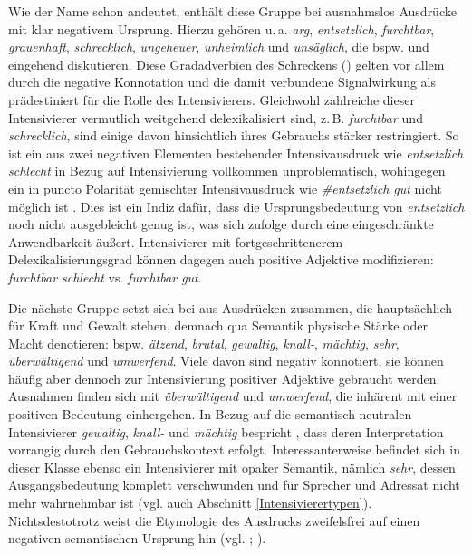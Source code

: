 Wie der Name schon andeutet, enthält diese Gruppe bei \citet[356]{Claudi.2006} ausnahmslos Ausdrücke mit klar negativem Ursprung. Hierzu gehören u.\,a. \textit{arg}, \textit{entsetzlich}, \textit{furchtbar}, \textit{grauenhaft}, \textit{schrecklich}, \textit{ungeheuer}, \textit{unheimlich} und \textit{unsäglich}, die bspw. \citet[165ff.]{Biedermann.1969} und \citet[]{Hentschel.1998b} eingehend diskutieren. Diese \glqq{}Gradadverbien des Schreckens\grqq{} (\citealt[53]{Laitenberger.2016}) gelten vor allem durch die negative Konnotation und die damit verbundene Signalwirkung als prädestiniert für die Rolle des Intensivierers. Gleichwohl zahlreiche dieser Intensivierer vermutlich weitgehend delexikalisiert sind, z.\,B. \textit{furchtbar} und \textit{schrecklich}, sind einige davon hinsichtlich ihres Gebrauchs stärker restringiert. So ist ein aus zwei negativen Elementen bestehender Intensivausdruck wie \textit{entsetzlich schlecht} in Bezug auf Intensivierung vollkommen unproblematisch, wohingegen ein in puncto Polarität gemischter Intensivausdruck wie \textit{\#entsetzlich gut} nicht möglich ist \citep[vgl.][356]{Claudi.2006}. Dies ist ein Indiz dafür, dass die Ursprungsbedeutung von \textit{entsetzlich} noch nicht ausgebleicht genug ist, was sich \citet[284]{Tagliamonte.2005} zufolge durch eine eingeschränkte Anwendbarkeit äußert. Intensivierer mit fortgeschrittenerem Delexikalisierungsgrad können dagegen auch positive Adjektive modifizieren: \textit{furchtbar schlecht} {vs. \textit{furchtbar gut}}.


Die nächste Gruppe setzt sich bei \citet[357]{Claudi.2006} aus Ausdrücken zusammen, die hauptsächlich für Kraft und Gewalt stehen, demnach qua Semantik physische Stärke oder Macht denotieren: bspw. \textit{ätzend}, \textit{brutal}, \textit{gewaltig}, \textit{knall-}, \textit{mächtig}, \textit{sehr}, \textit{überwältigend} und \textit{umwerfend}. Viele davon sind negativ konnotiert, sie können häufig aber dennoch zur Intensivierung positiver Adjektive gebraucht werden. Ausnahmen finden sich mit \textit{überwältigend} und \textit{umwerfend}, die inhärent mit einer positiven Bedeutung einhergehen. In Bezug auf die semantisch neutralen Intensivierer \textit{gewaltig}, \textit{knall-} und \textit{mächtig} bespricht \citet[357]{Claudi.2006}, dass deren Interpretation vorrangig durch den Gebrauchskontext erfolgt. Interessanterweise befindet sich in dieser Klasse ebenso ein Intensivierer mit opaker Semantik, nämlich \textit{sehr}, dessen Ausgangsbedeutung komplett verschwunden und für Sprecher und Adressat nicht mehr wahrnehmbar ist (vgl. auch Abschnitt \ref{Intensivierertypen}). Nichtsdestotrotz weist die Etymologie des Ausdrucks zweifelsfrei auf einen negativen semantischen Ursprung hin (vgl. {\citealt[1270]{Pfeifer.1995}}; \citealt[357]{Claudi.2006}).

